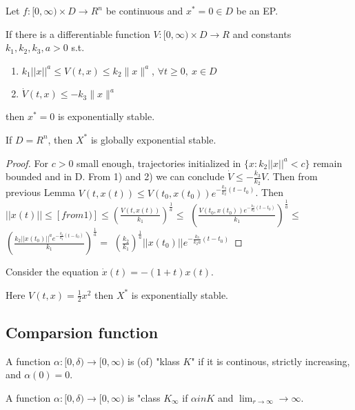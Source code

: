 \begin{Theorem}
 Let $f:[0, \infty)\times D \to R^n$ be continuous and $x^*=0 \in D$ be an EP.

 If there is a differentiable function $V:[0,\infty)\times D \to R$ and constants
 $k_1,k_2,k_3,a > 0$ s.t.
 \begin{enumerate}
  \item $k_1||x||^a \le V(t,x) \le k_2\|x\|^a$, $\forall t\ge 0, \ x\in D$
  \item $\dot V(t,x) \le -k_3\|x\|^a$
 \end{enumerate}

 then $x^*=0$ is exponentially stable.

 If $D=R^n$, then $X^*$ is globally exponential stable.

 \begin{proof}
 For $c>0$ small enough, trajectories initialized in $\{x:k_2||x||^a<c\}$
 remain bounded and in D. From 1) and 2) we can conclude 
 $\dot V \le -\frac{k_3}{k_2}V$. Then from previous Lemma 
 $V(t,x(t)) \le V(t_0,x(t_0))e^{-\frac{k_3}{k_2}(t-t_0)}$. Then
 $||x(t)|| \le [from 1)] \le \left( \frac{V(t,x(t))}{k_1}\right)^{\frac{1}{a}} \le$
 $\left(\frac{V(t_0,x(t_0))e^{-\frac{k_3}{k_2}(t-t_0)}}{k_1}\right)^{\frac{1}{a}} \le$ 
 $\left(\frac{k_2||x(t_0)||^a e^{-\frac{k_3}{k_2}(t-t_0)}}{k_1}\right)^{\frac{1}{a}} =$
 $\left( \frac{k_2}{k_1}\right)^{\frac{1}{a}} ||x(t_0)||e^{-\frac{k_3}{k_2a}(t-t_0)}$
 \end{proof}
\end{Theorem}

\begin{Example}
 Consider the equation $\dot x(t) = -(1+t)x(t)$.

 Here $V(t,x)=\frac{1}{2}x^2$ then $X^*$  is exponentially stable.
\end{Example}


\subsection{Comparsion function}

\begin{Definition}
 A function $\alpha:[0,\delta)\to [0, \infty)$ is (of) "klass $K$" if it is continous,
 strictly increasing, and $\alpha(0)=0$.
\end{Definition}

\begin{Definition}
 A function $\alpha:[0,\delta)\to [0, \infty)$ is "class $K_\infty$ if $\alpha in K$
 and $\lim_{r\to\infty} \to\infty$.
\end{Definition}


